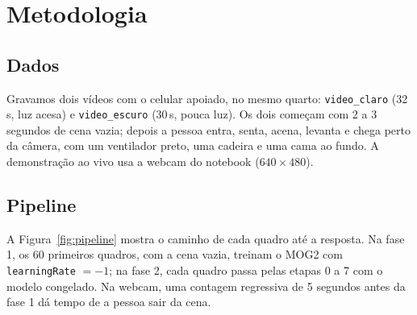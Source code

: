 \section{Metodologia}
\label{sec:metodologia}

\subsection{Dados}

Gravamos dois vídeos com o celular apoiado, no mesmo quarto:
\texttt{video\_claro} (32\,s, luz acesa) e \texttt{video\_escuro}
(30\,s, pouca luz). Os dois começam com 2 a 3 segundos de cena vazia;
depois a pessoa entra, senta, acena, levanta e chega perto da câmera,
com um ventilador preto, uma cadeira e uma cama ao fundo. A
demonstração ao vivo usa a webcam do notebook ($640 \times 480$).

\subsection{Pipeline}

A Figura~\ref{fig:pipeline} mostra o caminho de cada quadro até a
resposta. Na fase 1, os 60 primeiros quadros, com a cena vazia, treinam
o MOG2 com \texttt{learningRate} $= -1$; na fase 2, cada quadro passa
pelas etapas 0 a 7 com o modelo congelado. Na webcam, uma contagem
regressiva de 5 segundos antes da fase 1 dá tempo de a pessoa sair da
cena.

